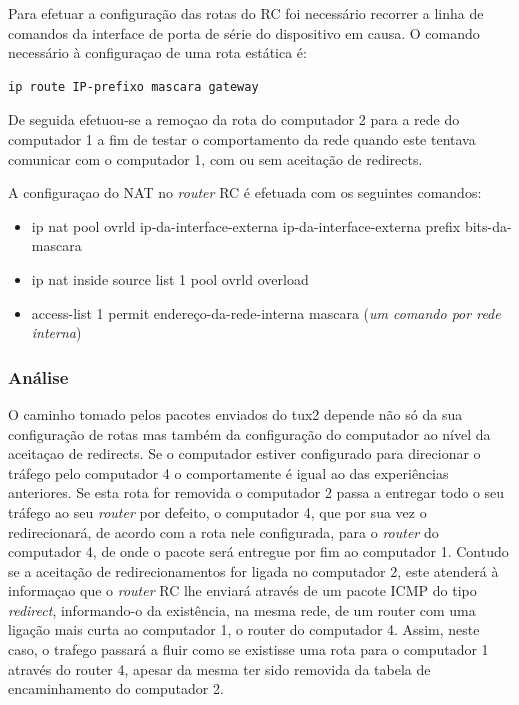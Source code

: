 \documentclass{article}
\begin{document}
Para efetuar a configuração das rotas do RC foi necessário recorrer a linha de comandos da interface de porta de série do dispositivo em causa. O comando necessário à configuraçao de uma rota estática é:

\begin{verbatim}
ip route IP-prefixo mascara gateway
\end{verbatim}

De seguida efetuou-se a remoçao da rota do computador 2 para a rede do computador 1 a fim de testar o comportamento da rede quando este tentava comunicar com o computador 1, com ou sem aceitação de redirects.

A configuraçao do NAT no \textit{router} RC é efetuada com os seguintes comandos:
\begin{itemize}
\item ip nat pool ovrld ip-da-interface-externa ip-da-interface-externa  prefix bits-da-mascara
\item ip nat inside source list 1 pool ovrld overload 
\item access-list 1 permit endereço-da-rede-interna mascara (\textit{um comando por rede interna})
\end{itemize}

\subsubsection{Análise}
O caminho tomado pelos pacotes enviados do tux2 depende não só da sua configuração de rotas mas também da configuração do computador ao nível da aceitaçao de redirects. Se o computador estiver configurado para direcionar o tráfego pelo computador 4 o comportamente é igual ao das experiências anteriores. Se esta rota for removida o computador 2 passa a entregar todo o seu tráfego ao seu \textit{router} por defeito, o computador 4, que por sua vez o redirecionará, de acordo com a rota nele configurada, para o \textit{router} do computador 4, de onde o pacote será entregue por fim ao computador 1. Contudo se a aceitação de redirecionamentos for ligada no computador 2, este atenderá à informaçao que o \textit{router} RC lhe enviará através de um pacote ICMP do tipo \textit{redirect}, informando-o da existência, na mesma rede, de um router com uma ligação mais curta ao computador 1, o router do computador 4. Assim, neste caso, o trafego passará a fluir como se existisse uma rota para o computador 1 através do router 4, apesar da mesma ter sido removida da tabela de encaminhamento do computador 2.
\end{document}
